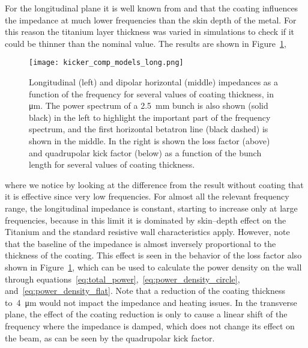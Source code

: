     For the longitudinal plane it is well known from  and  that the coating influences the impedance at much lower frequencies than the skin depth of the metal. For this reason the titanium layer thickness was varied in simulations to check if it could be thinner than the nominal value. The results are shown in Figure~\ref{fig:kicker_comp_models_long},
    \begin{figure}
        \centering
        \texttt{[image: kicker\_comp\_models\_long.png]}
        \caption[Titanium coating thickness effect on impedance.]{Longitudinal (left) and dipolar horizontal (middle) impedances as a function of the frequency for several values of coating thickness, in \si{\micro\meter}. The power spectrum of a \SI{2.5}{\milli\meter} bunch is also shown (solid black) in the left to highlight the important part of the frequency spectrum, and the first horizontal betatron line (black dashed) is shown in the middle. In the right is shown the loss factor (above) and quadrupolar kick factor (below) as a function of the bunch length for several values of coating thickness.}
        \label{fig:kicker_comp_models_long}
    \end{figure}
    where we notice by looking at the difference from the result without coating that it is effective since very low frequencies. For almost all the relevant frequency range, the longitudinal impedance is constant, starting to increase only at large frequencies, because in this limit it is dominated by skin--depth effect on the Titanium and the standard resistive wall characteristics apply. However, note that the baseline of the impedance is almost inversely proportional to the thickness of the coating. This effect is seen in the behavior of the loss factor also shown in Figure~\ref{fig:kicker_comp_models_long}, which can be used to calculate the power density on the wall through equations~\eqref{eq:total_power},~\eqref{eq:power_density_circle}, and~\eqref{eq:power_density_flat}. Note that a reduction of the coating thickness to~\SI{4}{\micro\meter} would not impact the impedance and heating issues. In the transverse plane, the effect of the coating reduction is only to cause a linear shift of the frequency where the impedance is damped, which does not change its effect on the beam, as can be seen by the quadrupolar kick factor.


